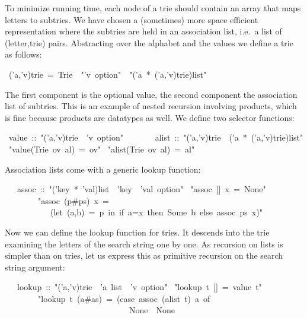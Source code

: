 \begin{isabelle}%
%
\begin{isamarkuptext}%
To minimize running time, each node of a trie should contain an array that maps
letters to subtries. We have chosen a (sometimes) more space efficient
representation where the subtries are held in an association list, i.e.\ a
list of (letter,trie) pairs.  Abstracting over the alphabet  and the
values  we define a trie as follows:%
\end{isamarkuptext}%
\ ('a,'v)trie\ =\ Trie\ \ {"}'v\ option{"}\ \ {"}('a\ *\ ('a,'v)trie)list{"}%
\begin{isamarkuptext}%
\noindent
The first component is the optional value, the second component the
association list of subtries.  This is an example of nested recursion involving products,
which is fine because products are datatypes as well.
We define two selector functions:%
\end{isamarkuptext}%
\ value\ ::\ {"}('a,'v)trie\ {\isasymRightarrow}\ 'v\ option{"}\isanewline
\ \ \ \ \ \ \ alist\ ::\ {"}('a,'v)trie\ {\isasymRightarrow}\ ('a\ *\ ('a,'v)trie)list{"}\isanewline
{}\ {"}value(Trie\ ov\ al)\ =\ ov{"}\isanewline
{}\ {"}alist(Trie\ ov\ al)\ =\ al{"}%
\begin{isamarkuptext}%
\noindent
Association lists come with a generic lookup function:%
\end{isamarkuptext}%
\ \ \ assoc\ ::\ {"}('key\ *\ 'val)list\ {\isasymRightarrow}\ 'key\ {\isasymRightarrow}\ 'val\ option{"}\isanewline
{}\ {"}assoc\ []\ x\ =\ None{"}\isanewline
\ \ \ \ \ \ \ \ {"}assoc\ (p\#ps)\ x\ =\isanewline
\ \ \ \ \ \ \ \ \ \ \ (let\ (a,b)\ =\ p\ in\ if\ a=x\ then\ Some\ b\ else\ assoc\ ps\ x){"}%
\begin{isamarkuptext}%
Now we can define the lookup function for tries. It descends into the trie
examining the letters of the search string one by one. As
recursion on lists is simpler than on tries, let us express this as primitive
recursion on the search string argument:%
\end{isamarkuptext}%
\ \ \ lookup\ ::\ {"}('a,'v)trie\ {\isasymRightarrow}\ 'a\ list\ {\isasymRightarrow}\ 'v\ option{"}\isanewline
{}\ {"}lookup\ t\ []\ =\ value\ t{"}\isanewline
\ \ \ \ \ \ \ \ {"}lookup\ t\ (a\#as)\ =\ (case\ assoc\ (alist\ t)\ a\ of\isanewline
\ \ \ \ \ \ \ \ \ \ \ \ \ \ \ \ \ \ \ \ \ \ \ \ \ \ \ \ \ \ None\ {\isasymRightarrow}\ None\isanewline

\end{isabelle}
